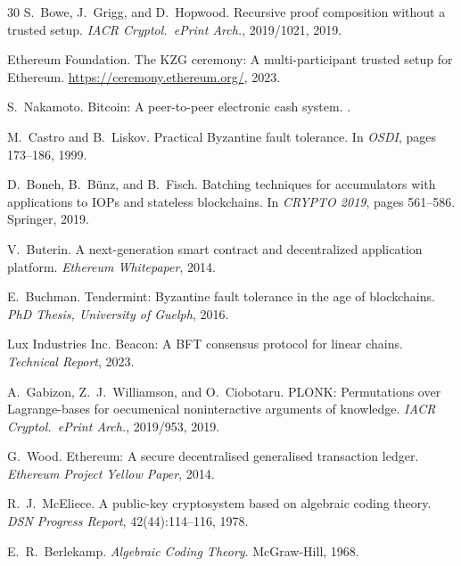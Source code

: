 \begin{thebibliography}{30}
S.~Bowe, J.~Grigg, and D.~Hopwood.
\newblock Recursive proof composition without a trusted setup.
\newblock \emph{IACR Cryptol.\ ePrint Arch.}, 2019/1021, 2019.

Ethereum Foundation.
\newblock The KZG ceremony: A multi-participant trusted setup for Ethereum.
\newblock \url{https://ceremony.ethereum.org/}, 2023.

S.~Nakamoto.
\newblock Bitcoin: A peer-to-peer electronic cash system.
.

M.~Castro and B.~Liskov.
\newblock Practical Byzantine fault tolerance.
\newblock In \emph{OSDI}, pages 173--186, 1999.

D.~Boneh, B.~B{\"u}nz, and B.~Fisch.
\newblock Batching techniques for accumulators with applications to IOPs and
  stateless blockchains.
\newblock In \emph{CRYPTO 2019}, pages 561--586. Springer, 2019.

V.~Buterin.
\newblock A next-generation smart contract and decentralized application
  platform.
\newblock \emph{Ethereum Whitepaper}, 2014.

E.~Buchman.
\newblock Tendermint: Byzantine fault tolerance in the age of blockchains.
\newblock \emph{PhD Thesis, University of Guelph}, 2016.

Lux Industries Inc.
\newblock Beacon: A BFT consensus protocol for linear chains.
\newblock \emph{Technical Report}, 2023.

A.~Gabizon, Z.~J.~Williamson, and O.~Ciobotaru.
\newblock PLONK: Permutations over Lagrange-bases for oecumenical
  noninteractive arguments of knowledge.
\newblock \emph{IACR Cryptol.\ ePrint Arch.}, 2019/953, 2019.

G.~Wood.
\newblock Ethereum: A secure decentralised generalised transaction ledger.
\newblock \emph{Ethereum Project Yellow Paper}, 2014.

R.~J.~McEliece.
\newblock A public-key cryptosystem based on algebraic coding theory.
\newblock \emph{DSN Progress Report}, 42(44):114--116, 1978.

E.~R.~Berlekamp.
\newblock \emph{Algebraic Coding Theory}.
\newblock McGraw-Hill, 1968.

\end{thebibliography}

\newpage
\appendix

